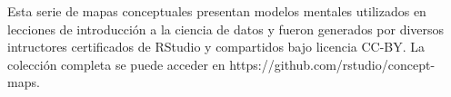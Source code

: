 Esta serie de mapas conceptuales presentan modelos mentales utilizados en lecciones de introducción a la ciencia de datos y fueron generados por diversos intructores certificados de RStudio y compartidos bajo licencia CC-BY.  La colección completa se puede acceder en https://github.com/rstudio/concept-maps.



